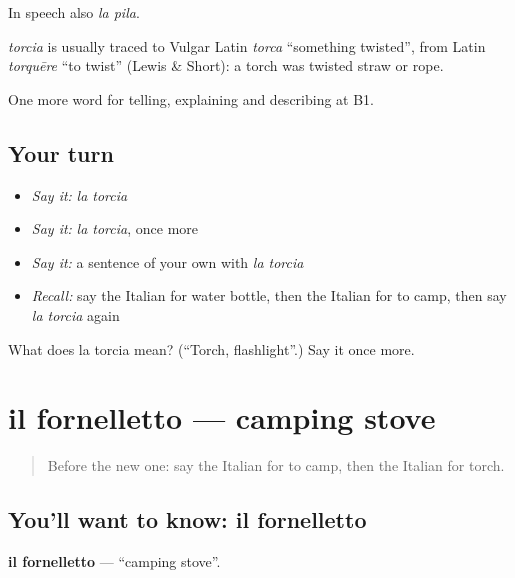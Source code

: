 In speech also \emph{la pila}.

\begin{cousinweb}
\emph{torcia} is usually traced to Vulgar Latin \emph{torca} \textquotedblleft{}something twisted\textquotedblright{}, from Latin \emph{torquēre} \textquotedblleft{}to twist\textquotedblright{} (Lewis \& Short): a torch was twisted straw or rope.
\end{cousinweb}

\begin{grammarlens}[title={What you've built}]
One more word for telling, explaining and describing at B1.
\end{grammarlens}

\subsection*{Your turn}
\begin{itemize}
\raggedright
  \item \emph{Say it:} \emph{la torcia}
  \item \emph{Say it:} \emph{la torcia}, once more
  \item \emph{Say it:} a sentence of your own with \emph{la torcia}
  \item \emph{Recall:} say the Italian for water bottle, then the Italian for to camp, then say \emph{la torcia} again
\end{itemize}

\begin{tcolorbox}[breakable,colback=teal!4,colframe=teal!35!black,title={Before you move on}]
What does la torcia mean? (\textquotedblleft{}Torch, flashlight\textquotedblright{}.) Say it once more.
\end{tcolorbox}
\section[il fornelletto]{il fornelletto — camping stove}

\label{lesson:IT-C502-fornelletto}



\begin{quote}
Before the new one: say the Italian for to camp, then the Italian for torch.
\end{quote}

\subsection*{You'll want to know: il fornelletto}
\textbf{il fornelletto} — \textquotedblleft{}camping stove\textquotedblright{}.

